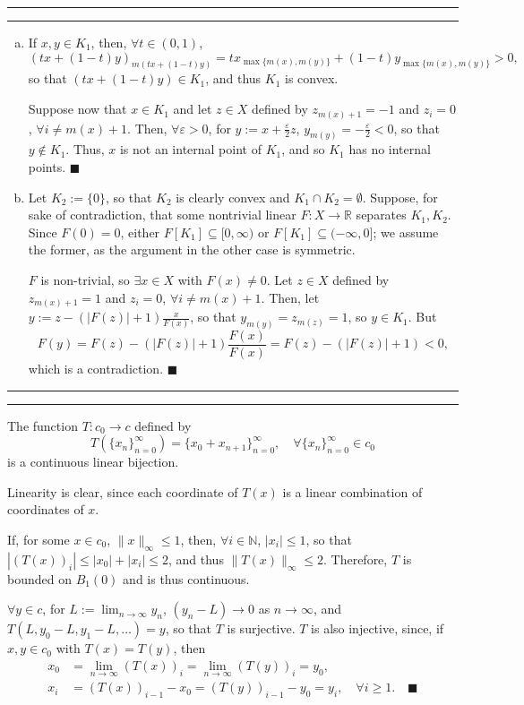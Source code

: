 \documentclass[11pt]{article}
\newcounter{questionCounter}
\newcounter{partCounter}[questionCounter]
\newenvironment{question}[2][\arabic{questionCounter}]{%
    \setcounter{partCounter}{0}%
    \vspace{.25in} \hrule \vspace{0.5em}%
        \noindent{\bf #2}%
    \vspace{0.8em} \hrule \vspace{.10in}%
    \addtocounter{questionCounter}{1}%
}{}
\renewcommand{\qed}{\quad $\blacksquare$}
\newcommand{\mqed}{\quad \blacksquare}
\newcommand{\N}{\mathbb{N}} %
\newcommand{\R}{\mathbb{R}} %
\newcommand{\e}{\varepsilon} %
\begin{document}
\newpage
\begin{question}{Problem 5}
\begin{enumerate}[(a)]
\item If $x, y \in K_1$, then, $\forall t \in (0,1)$,
\[(tx + (1 - t)y)_{m(tx + (1 - t)y)}
 = tx_{\max\{m(x),m(y)\}} + (1 - t)y_{\max\{m(x),m(y)\}}
 > 0,\]
so that $(tx + (1 - t)y) \in K_1$, and thus $K_1$ is convex.

Suppose now that $x \in K_1$ and let $z \in X$ defined by
$z_{m(x) + 1} = -1$ and $z_i = 0$, $\forall i \neq m(x) + 1$. Then,
$\forall \e > 0$, for $y := x + \frac{\e}{2}z$, $y_{m(y)} = -\frac{\e}{2} <
0$, so that $y \notin K_1$. Thus, $x$ is not an internal point of $K_1$, and so
$K_1$ has no internal points. \qed

\item Let $K_2 := \{0\}$, so that $K_2$ is clearly convex and
$K_1 \cap K_2 = \emptyset$. Suppose, for sake of contradiction, that some
nontrivial linear $F : X \rightarrow \R$ separates $K_1, K_2$. Since
$F(0) = 0$, either $F[K_1] \subseteq [0,\infty)$ or
$F[K_1] \subseteq (-\infty,0]$; we assume the former, as the argument in the
other case is symmetric.

$F$ is non-trivial, so $\exists x \in X$ with $F(x) \neq 0$. Let $z \in X$
defined by $z_{m(x) + 1} = 1$ and $z_i = 0$, $\forall i \neq m(x) + 1$. Then,
let $y := z - (|F(z)| + 1)\frac{x}{F(x)}$, so that $y_{m(y)} = z_{m(z)} = 1$,
so $y \in K_1$. But
\[F(y) = F(z) - (|F(z)| + 1)\frac{F(x)}{F(x)} = F(z) - (|F(z)| + 1) < 0,\]
which is a contradiction. \qed
\end{enumerate}
\end{question}

\begin{question}{Problem 6}
The function $T : c_0 \rightarrow c$ defined by
\[T\left( \{x_n\}_{n = 0}^{\infty} \right)
 = \{x_0 + x_{n + 1}\}_{n = 0}^{\infty}, \quad
    \forall \{x_n\}_{n = 0}^{\infty} \in c_0
\]
is a continuous linear bijection.

Linearity is clear, since each coordinate of $T(x)$ is a linear combination of
coordinates of $x$.

If, for some $x \in c_0$, $\|x\|_{\infty} \leq 1$, then, $\forall i \in \N$,
$|x_i| \leq 1$, so that $|(T(x))_i| \leq |x_0| + |x_i| \leq 2$, and thus
$\|T(x)\|_{\infty} \leq 2$. Therefore, $T$ is bounded on $B_1(0)$ and is thus
continuous.

$\forall y \in c$, for $L := \lim_{n \rightarrow \infty} y_n$,
$(y_n - L) \rightarrow 0$ as $n \rightarrow \infty$, and 
$T(L,y_0 - L,y_1 - L,\ldots) = y$, so that $T$ is surjective.
$T$ is also injective, since, if $x,y \in c_0$ with $T(x) = T(y)$, then
\begin{align*}
x_0
 & = \lim_{n \rightarrow \infty} (T(x))_i
   = \lim_{n \rightarrow \infty} (T(y))_i
   = y_0, \\
x_i
 & = (T(x))_{i - 1} - x_0
   = (T(y))_{i - 1} - y_0
   = y_i, \quad \forall i \geq 1. \mqed
\end{align*}
\end{question}
\end{document}
